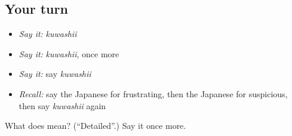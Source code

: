 \subsection*{Your turn}
\begin{itemize}
\raggedright
  \item \emph{Say it:} \emph{kuwashii}
  \item \emph{Say it:} \emph{kuwashii}, once more
  \item \emph{Say it:} say \emph{kuwashii}
  \item \emph{Recall:} say the Japanese for frustrating, then the Japanese for suspicious, then say \emph{kuwashii} again
\end{itemize}

\begin{tcolorbox}[breakable,colback=teal!4,colframe=teal!35!black,title={Before you move on}]
What does  mean? (\textquotedblleft{}Detailed\textquotedblright{}.) Say it once more.
\end{tcolorbox}
